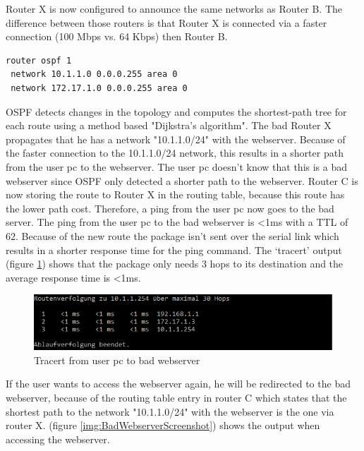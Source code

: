 Router X is now configured to announce the same networks as Router B. The difference between those routers is that Router X is connected via a faster connection (100 Mbps vs. 64 Kbps) then Router B.

\begin{lstlisting}[caption={\ac{OSPF} configuration on router X},label={lst:ospfRouterX},language={}]
router ospf 1
 network 10.1.1.0 0.0.0.255 area 0
 network 172.17.1.0 0.0.0.255 area 0
\end{lstlisting}

\ac{OSPF} detects changes in the topology and computes the shortest-path tree for each route using a method based "Dijkstra's algorithm". The bad Router X propagates that he has a network "10.1.1.0/24" with the webserver.
Because of the faster connection to the 10.1.1.0/24 network, this results in a shorter path from the user pc to the webserver. The user pc doesn't know that this is a bad webserver since \ac{OSPF} only detected a shorter path to the webserver. Router C is now storing the route to Router X in the routing table, because this route has the lower path cost. Therefore, a ping from the user pc now goes to the bad server.
The ping from the user pc to the bad webserver is <1ms with a TTL of 62. Because of the new route the package isn't sent over the serial link which results in a shorter response time for the ping command. The `tracert' output (figure \ref{img:TracertBadWebserver}) shows that the package only needs 3 hops to its destination and the average response time is <1ms.

\begin{figure}[H]
	\centering
	\includegraphics[width=1.0\textwidth]{img/TracertBadWebserver.png}
	\caption{Tracert from user pc to bad webserver}
	\label{img:TracertBadWebserver}
\end{figure}

If the user wants to access the webserver again, he will be redirected to the bad webserver, because of the routing table entry in router C which states that the shortest path to the network "10.1.1.0/24" with the webserver is the one via router X.
(figure \ref{img:BadWebserverScreenshot}) shows the output when accessing the webserver.


